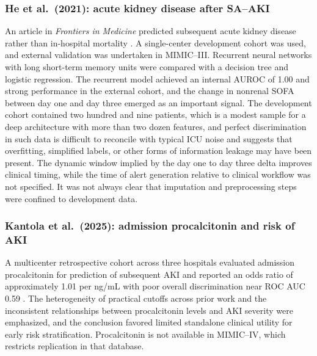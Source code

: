 \subsubsection{He et al.\ (2021): acute kidney disease after SA--AKI}
An article in \emph{Frontiers in Medicine} predicted subsequent acute kidney disease rather than in-hospital mortality \citep{He_2021_FrontMed}. A single-center development cohort was used, and external validation was undertaken in MIMIC--III. Recurrent neural networks with long short-term memory units were compared with a decision tree and logistic regression. The recurrent model achieved an internal AUROC of 1.00 and strong performance in the external cohort, and the change in nonrenal SOFA between day one and day three emerged as an important signal. The development cohort contained two hundred and nine patients, which is a modest sample for a deep architecture with more than two dozen features, and perfect discrimination in such data is difficult to reconcile with typical ICU noise and suggests that overfitting, simplified labels, or other forms of information leakage may have been present. The dynamic window implied by the day one to day three delta improves clinical timing, while the time of alert generation relative to clinical workflow was not specified. It was not always clear that imputation and preprocessing steps were confined to development data.

\subsubsection{Kantola et al.\ (2025): admission procalcitonin and risk of AKI}
A multicenter retrospective cohort across three hospitals evaluated admission procalcitonin for prediction of subsequent AKI and reported an odds ratio of approximately 1.01 per ng/mL with poor overall discrimination near ROC AUC 0.59 \citep{Kantola_2025}. The heterogeneity of practical cutoffs across prior work and the inconsistent relationships between procalcitonin levels and AKI severity were emphasized, and the conclusion favored limited standalone clinical utility for early risk stratification. Procalcitonin is not available in MIMIC--IV, which restricts replication in that database.

